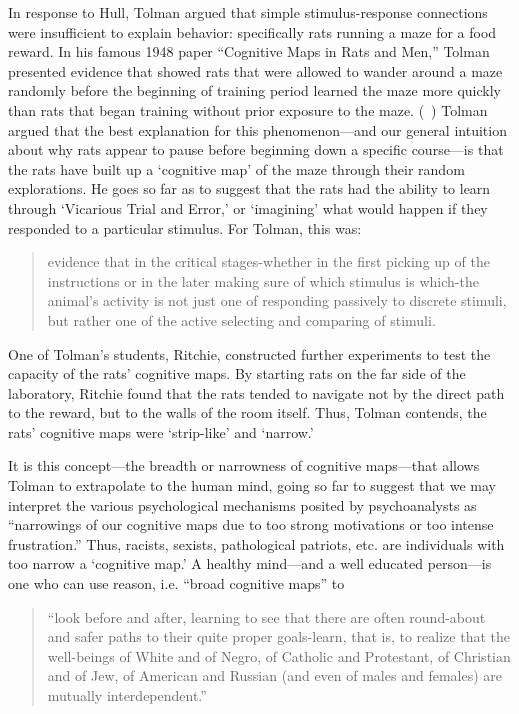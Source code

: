 \begin{refsection}
In response to Hull, Tolman argued that simple stimulus-response connections were insufficient to explain behavior: specifically rats running a maze for a food reward. In his famous 1948 paper “Cognitive Maps in Rats and Men,” Tolman presented evidence that showed rats that were allowed to wander around a maze randomly before the beginning of training period learned the maze more quickly than rats that began training without prior exposure to the maze. (~\citep{Tolman:1948kv}) Tolman argued that the best explanation for this phenomenon---and our general intuition about why rats appear to pause before beginning down a specific course---is that the rats have built up a `cognitive map' of the maze through their random explorations. He goes so far as to suggest that the rats had the ability to learn through `Vicarious Trial and Error,' or `imagining' what would happen if they responded to a particular stimulus. For Tolman, this was:

\begin{quote}

evidence that in the critical stages-whether in the first picking up of the instructions or in the later making sure of which stimulus is which-the animal's activity is not just one of responding passively to discrete stimuli, but rather one of the active selecting and comparing of stimuli. ~\citep[p. 200]{Tolman:1948kv}
\end{quote}

One of Tolman's students, Ritchie, constructed further experiments to test the capacity of the rats' cognitive maps. By starting rats on the far side of the laboratory, Ritchie found that the rats tended to navigate not by the direct path to the reward, but to the walls of the room itself. Thus, Tolman contends, the rats' cognitive maps were `strip-like' and `narrow.'

It is this concept—the breadth or narrowness of cognitive maps—that allows Tolman to extrapolate to the human mind, going so far to suggest that we may interpret the various psychological mechanisms posited by psychoanalysts as “narrowings of our cognitive maps due to too strong motivations or too intense frustration.” Thus, racists, sexists, pathological patriots, etc. are individuals with too narrow a `cognitive map.' A healthy mind---and a well educated person---is one who can use reason, i.e. “broad cognitive maps” to

\begin{quote}

“look before and after, learning to see that there are often round-about and safer paths to their quite proper goals-learn, that is, to realize that the well-beings of White and of Negro, of Catholic and Protestant, of Christian and of Jew, of American and Russian (and even of males and females) are mutually interdependent.” ~\citep[p. 208]{Tolman:1948kv}
\end{quote}


\end{refsection}

